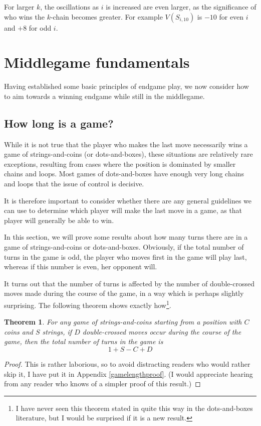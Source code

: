 \documentclass[a4paper,twocolumn]{article}
\newtheorem{gamelength}[thm]{Theorem}
\begin{document}
For larger $k$, the oscillations as $i$ is increased are even larger,
as the significance of who wins the $k$-chain becomes greater. For
example $V(S_{i,10})$ is $-10$ for even $i$ and $+8$ for odd $i$.

\section{Middlegame fundamentals}

Having established some basic principles of endgame play, we now
consider how to aim towards a winning endgame while still in the
middlegame.

\subsection{How long is a game?}

While it is not true that the player who makes the last move
necessarily wins a game of strings-and-coins (or dots-and-boxes),
these situations are relatively rare exceptions, resulting from cases
where the position is dominated by smaller chains and loops. Most
games of dots-and-boxes have enough very long chains and loops that
the issue of control is decisive.

It is therefore important to consider whether there are any general
guidelines we can use to determine which player will make the last
move in a game, as that player will generally be able to win.

In this section, we will prove some results about how many turns there
are in a game of strings-and-coins or dots-and-boxes. Obviously, if
the total number of turns in the game is odd, the player who moves
first in the game will play last, whereas if this number is even, her
opponent will.

It turns out that the number of turns is affected by the number of
double-crossed moves made during the course of the game, in a way
which is perhaps slightly surprising. The following theorem shows
exactly how\footnote{I have never seen this theorem stated in quite
  this way in the dots-and-boxes literature, but I would be surprised
  if it is a new result.}.

\begin{gamelength}\label{gamelength}
  For any game of strings-and-coins starting from a position with $C$
  coins and $S$ strings, if $D$ double-crossed moves occur during
  the course of the game, then the total number of turns in the game
  is $$1 + S - C + D$$
\end{gamelength}
\begin{proof}
  This is rather laborious, so to avoid distracting readers who would
  rather skip it, I have put it in Appendix \ref{gamelengthproof}. (I
  would appreciate hearing from any reader who knows of a simpler
  proof of this result.)
\end{proof}
\end{document}
